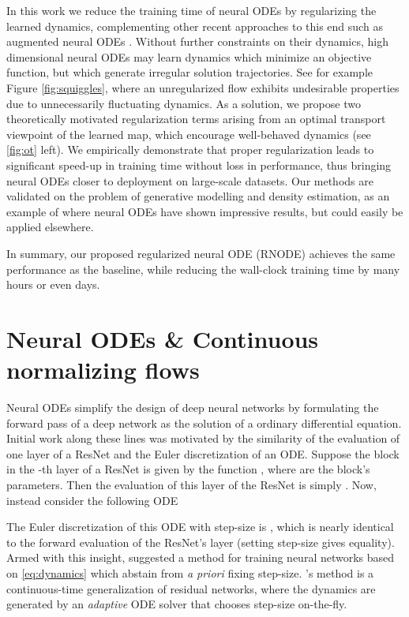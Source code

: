 \documentclass{article}
\theoremstyle{definition}
\theoremstyle{remark}
\begin{document}
In this work we reduce the 
training time of neural ODEs by regularizing the learned dynamics, complementing
other recent approaches to this end such as augmented neural ODEs \cite{augmentednodes}.
Without further constraints on their dynamics, high dimensional neural ODEs may
learn dynamics which minimize an objective function, but which generate
irregular solution trajectories. See for example Figure \ref{fig:squiggles}, where an
unregularized flow exhibits undesirable properties due to unnecessarily fluctuating dynamics.
As a solution, we propose two theoretically motivated regularization terms arising from an optimal transport viewpoint of the learned map, which
encourage well-behaved dynamics (see \ref{fig:ot} left). We empirically demonstrate that proper regularization leads to significant speed-up in training time without loss in performance, thus bringing neural ODEs closer to deployment
on large-scale datasets. Our methods are validated on the problem of generative
modelling and density estimation, as an example of where neural ODEs have shown impressive results, but could easily be applied elsewhere.

In summary, our proposed regularized neural ODE (RNODE) achieves the same performance as the baseline, while reducing the wall-clock training time by many hours or even days.






\section{Neural ODEs \& Continuous normalizing flows}
Neural ODEs simplify the design of deep neural networks by formulating the
forward pass of a deep network as the solution of a ordinary differential
equation.  Initial work along these lines was motivated by the similarity of the
evaluation of one layer of a ResNet and the Euler discretization of an ODE.
Suppose the block in the -th layer of a ResNet is given by the function , where  are the block's parameters. Then the
evaluation of this layer of the ResNet is simply .
Now, instead consider the following ODE

The Euler discretization of this ODE with step-size  is , which is nearly identical to the forward
evaluation of the ResNet's layer (setting step-size  gives equality).
Armed with this insight, \citet{chen2018neural} suggested a method  for training
neural networks based on \eqref{eq:dynamics} which abstain
from \emph{a priori} fixing step-size. \citeauthor{chen2018neural}'s method is a continuous-time
generalization of residual networks, where the dynamics are generated by an
\emph{adaptive} ODE solver that chooses step-size on-the-fly. 
\end{document}

